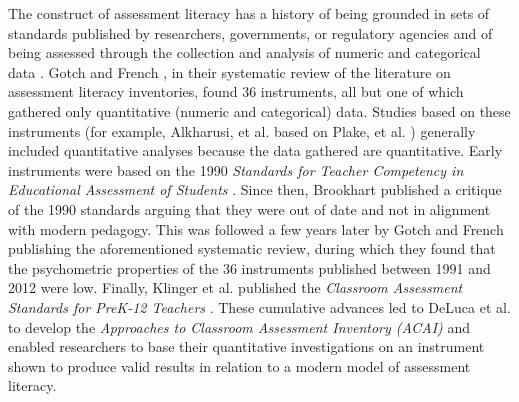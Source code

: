 \documentclass[
]{book}
\begin{document}
The construct of assessment literacy has a history of being grounded in sets of standards published by researchers, governments, or regulatory agencies and of being assessed through the collection and analysis of numeric and categorical data \citep{delucaTeachersApproachesClassroom2016, gotchSystematicReviewAssessment2014}. Gotch and French \citeyearpar{gotchSystematicReviewAssessment2014}, in their systematic review of the literature on assessment literacy inventories, found 36 instruments, all but one of which \citep{jarrEducationPractitionersInterpretation2012} gathered only quantitative (numeric and categorical) data. Studies based on these instruments (for example, Alkharusi, et al. \citeyearpar{alkharusiEducationalAssessmentAttitudes2012} based on Plake, et al. \citeyearpar{plakeAssessmentCompetenciesTeachers2005}) generally included quantitative analyses because the data gathered are quantitative. Early instruments \citep{mertlerMeasuringTeachersKnowledge2005, plakeTeacherAssessmentLiteracy1993} were based on the 1990 \emph{Standards for Teacher Competency in Educational Assessment of Students} \citep{StandardsTeacherCompetence1990}. Since then, Brookhart \citeyearpar{brookhartEducationalAssessmentKnowledge2011} published a critique of the 1990 standards arguing that they were out of date and not in alignment with modern pedagogy. This was followed a few years later by Gotch and French \citeyearpar{gotchSystematicReviewAssessment2014} publishing the aforementioned systematic review, during which they found that the psychometric properties of the 36 instruments published between 1991 and 2012 were low. Finally, Klinger et al. \citeyearpar{klingerClassroomAssessmentStandards2015} published the \emph{Classroom Assessment Standards for PreK-12 Teachers} \citep{klingerClassroomAssessmentStandards2015}. These cumulative advances led to DeLuca et al. \citeyearpar{delucaTeacherAssessmentLiteracy2016} to develop the \emph{Approaches to Classroom Assessment Inventory (ACAI)} and enabled researchers to base their quantitative investigations on an instrument shown to produce valid results in relation to a modern model of assessment literacy.
\end{document}
